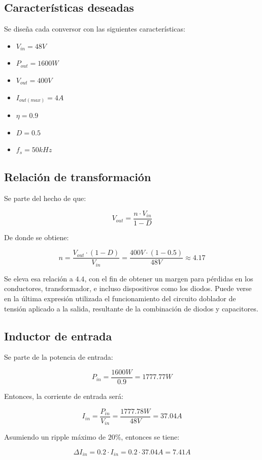 \subsection{Características deseadas}

Se diseña cada conversor con las siguientes características:

\begin{itemize}
	\item $V_{in}=48V$
	\item $P_{out}=1600W$
	\item $V_{out}=400V$
	\item $I_{out(max)}=4A$
	\item $\eta =0.9$
	\item $D=0.5$
	\item $f_s=50kHz$
\end{itemize}

\subsection{Relación de transformación}

Se parte del hecho de que:

$$
V_{out}=\frac{n\cdot V_{in}}{1-D}
$$

De donde se obtiene:

$$
n=\frac{V_{out}\cdot (1-D)}{V_{in}}=\frac{400V\cdot (1-0.5)}{48V}\approx 4.17
$$

Se eleva esa relación a $4.4$, con el fin de obtener un margen para pérdidas en los conductores, transformador, e incluso dispositivos como los diodos. Puede verse en la última expresión utilizada el funcionamiento del circuito doblador de tensión aplicado a la salida, resultante de la combinación de diodos y capacitores.

\subsection{Inductor de entrada}

Se parte de la potencia de entrada:

$$
P_{in}=\frac{1600W}{0.9}=1777.77W
$$

Entonces, la corriente de entrada será:

$$
I_{in} = \frac{P_{in}}{V_{in}}=\frac{1777.78W}{48V}=37.04A
$$

Asumiendo un ripple máximo de $20\%$, entonces se tiene:

$$
\Delta I_{in} = 0.2\cdot I_{in}=0.2\cdot 37.04 A = 7.41A
$$

